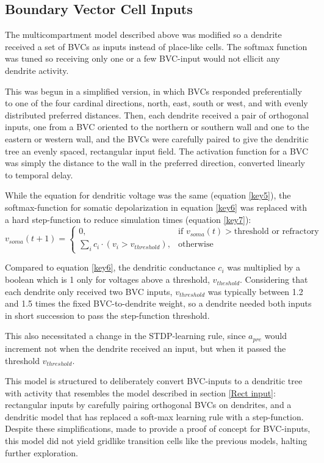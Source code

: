 \documentclass{article}
\begin{document}
    \subsection{Boundary Vector Cell Inputs} \label{BVC Model}
    The multicompartment model described above was modified so a dendrite received a set of BVCs as inputs instead of place-like cells. The softmax function was tuned so receiving only one or a few BVC-input would not ellicit any dendrite activity.

    This was begun in a simplified version, in which BVCs responded preferentially to one of the four cardinal directions, north, east, south or west, and with evenly distributed preferred distances. Then, each dendrite received a pair of orthogonal inputs, one from a BVC oriented to the northern or southern wall and one to the eastern or western wall, and the BVCs were carefully paired to give the dendritic tree an evenly spaced, rectangular input field. The activation function for a BVC was simply the distance to the wall in the preferred direction, converted linearly to temporal delay.
        
    While the equation for dendritic voltage was the same (equation \ref{key5}), the softmax-function for somatic depolarization in equation \ref{key6} was replaced with a hard step-function to reduce simulation times (equation \ref{key7}):
    \begin{equation}\label{key7} v_{soma}(t + 1) = \begin{cases} 0, & \text{if } v_{soma}(t) > \text{threshold or refractory}\\
        \sum_{i}^{} c_i \cdot (v_i > v_{threshold}), & \text{otherwise} \end{cases}\end{equation} 
    
    Compared to equation \ref{key6}, the dendritic conductance \(c_i\) was multiplied by a boolean which is 1 only for voltages above a threshold, \(v_{theshold}\). Considering that each dendrite only received two BVC inputs, \(v_{threshold}\) was typically between 1.2 and 1.5 times the fixed BVC-to-dendrite weight, so a dendrite needed both inputs in short succession to pass the step-function threshold.

    This also necessitated a change in the STDP-learning rule, since \(a_{pre}\) would increment not when the dendrite received an input, but when it passed the threshold \(v_{threshold}\).

    This model is structured to deliberately convert BVC-inputs to a dendritic tree with activity that resembles the model described in section \ref{Rect input}: rectangular inputs by carefully pairing orthogonal BVCs on dendrites, and a dendritic model that has replaced a soft-max learning rule with a step-function. Despite these simplifications, made to provide a proof of concept for BVC-inputs, this model did not yield gridlike transition cells like the previous models, halting further exploration.
\end{document}
